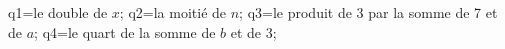\documentclass[exercice]{thedocument}%
\begin{document}
%
\>q1=le double de $x$;%
\>q2=la moitié de $n$;%
\>q3=le produit de 3 par la somme de 7 et de $a$;%
\>q4=le quart de la somme de $b$ et de 3;%
%
\end{document}
